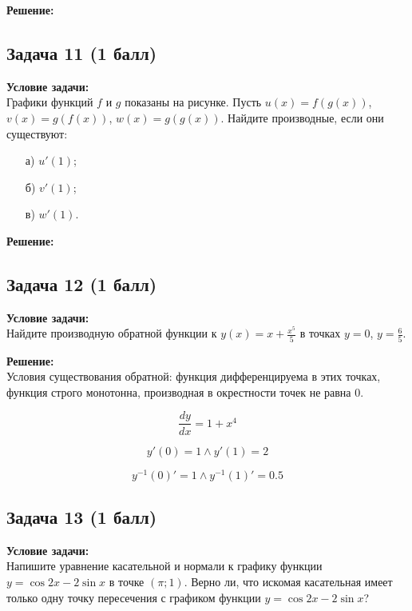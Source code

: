 \documentclass[a4paper,12pt]{article}
\begin{document}
\textbf{Решение:} \\

\vspace{1cm}

\subsection{Задача 11 (1 балл)}
\textbf{Условие задачи:} \\
Графики функций \( f \) и \( g \) показаны на рисунке. Пусть \( u(x) = f(g(x)) \), \( v(x) = g(f(x)) \), \( w(x) = g(g(x)) \). Найдите производные, если они существуют:
\begin{itemize}
    \item[а)] \( u'(1) \);
    \item[б)] \( v'(1) \);
    \item[в)] \( w'(1) \).
\end{itemize}

\textbf{Решение:} \\

\vspace{1cm}

\subsection{Задача 12 (1 балл)}
\textbf{Условие задачи:} \\
Найдите производную обратной функции к \( y(x) = x + \frac{x^5}{5} \) в точках \( y = 0 \), \( y = \frac{6}{5} \).

\textbf{Решение:} \\

Условия существования обратной: функция дифференцируема в этих точках, функция строго монотонна, производная в окрестности точек не равна 0.

\[
\frac{dy}{dx} = 1 + x^4
\]

\[
y'(0) = 1 \land y'(1) = 2
\]

\[
y^{-1}(0)' = 1 \land y^{-1}(1)' = 0.5
\]
\vspace{1cm}

\subsection{Задача 13 (1 балл)}
\textbf{Условие задачи:} \\
Напишите уравнение касательной и нормали к графику функции \( y = \cos 2x - 2 \sin x \) в точке \( (\pi; 1) \). Верно ли, что искомая касательная имеет только одну точку пересечения с графиком функции \( y = \cos 2x - 2 \sin x \)?
\end{document}
